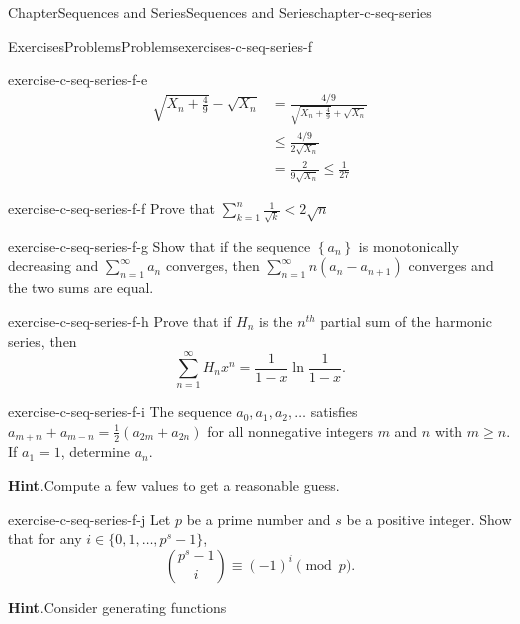 \documentclass[oneside,10pt,]{book}
\newcommand{\blocktitlefont}{\relax}
\numberwithin{equation}{section}
\newcommand{\lt}{<}
\begin{document}
\begin{chapterptx}{Chapter}{Sequences and Series}{}{Sequences and Series}{}{}{chapter-c-seq-series}
\begin{exercises-section}{Exercises}{Problems}{}{Problems}{}{}{exercises-c-seq-series-f}
\begin{divisionexercise}{4}{}{}{exercise-c-seq-series-f-e}
\begin{equation*}
\begin{split}
\sqrt{X_n + \frac{4}{9}}-\sqrt{X_n} &= \frac{4/9}{\sqrt{X_n + \frac{4}{9}}+\sqrt{X_n} }\\
&\leq \frac{4/9}{2\sqrt{X_n} }\\
&= \frac{2}{9 \sqrt{X_n}} \leq \frac{1}{27}
\end{split}
\end{equation*}
%
\end{divisionexercise}%
\begin{divisionexercise}{5}{}{}{exercise-c-seq-series-f-f}%
Prove that \(\sum _{k=1}^n \frac{1}{\sqrt{k}}\lt 2\sqrt{n}\)%
\end{divisionexercise}%
\begin{divisionexercise}{6}{}{}{exercise-c-seq-series-f-g}%
Show that if the sequence \(\left\{a_n\right\}\) is monotonically decreasing and \(\sum _{n=1}^{\infty } a_n\) converges, then \(\sum _{n=1}^{\infty} n \left(a_n-a_{n+1}\right)\) converges and the two sums are equal.%
\end{divisionexercise}%
\begin{divisionexercise}{7}{}{}{exercise-c-seq-series-f-h}%
Prove that if \(H_n\) is the \(n^{th}\) partial sum of the harmonic series, then%
\begin{equation*}
\sum_{n=1}^{\infty} H_{n} x^n = \frac{1}{1-x} \ln{\frac{1}{1-x}}\text{.}
\end{equation*}
%
\end{divisionexercise}%
\begin{divisionexercise}{8}{}{}{exercise-c-seq-series-f-i}%
The sequence \(a_0, a_1, a_2,\ldots\) satisfies \(a_{m+n}+a_{m-n}=\frac{1}{2}\left(a_{2m}+a_{2n}\right)\) for all nonnegative integers \(m\) and \(n\) with \(m\geq n\).  If \(a_1= 1\), determine \(a_n\).%
\par\smallskip%
\noindent\textbf{\blocktitlefont Hint}.\hypertarget{hint-c-seq-series-f-i-b}{}\quad{}Compute a few values to get a reasonable guess.%
\end{divisionexercise}%
\begin{divisionexercise}{9}{}{}{exercise-c-seq-series-f-j}%
Let \(p\) be a prime number and \(s\) be a positive integer.  Show that for any \(i \in \{0, 1, \dots,p^s-1\}\),%
\begin{equation*}
\binom{p^s-1}{i} \equiv (-1)^i \pmod{p}.
\end{equation*}
%
\par\smallskip%
\noindent\textbf{\blocktitlefont Hint}.\hypertarget{hint-c-seq-series-f-j-b}{}\quad{}Consider generating functions%

\end{divisionexercise}
\end{exercises-section}
\end{chapterptx}
\end{document}
